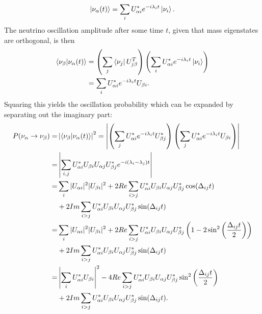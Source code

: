 \begin{equation}
\ket{\nu_\alpha(t)} = \sum_i U_{\alpha i}^*e^{-i\lambda_i t}\ket{\nu_i}.
\end{equation}
The neutrino oscillation amplitude after some time $t$, given that mass eigenstates are orthogonal, is then
\begin{align}
\braket{\nu_\beta|\nu_\alpha(t)} &= \left(\sum_j \bra{\nu_j}U^T_{j\beta}\right)\left( \sum_i U_{\alpha i}^*e^{-i\lambda_i t}\ket{\nu_i}\right)\\
&= \sum_i U^*_{\alpha i} e^{-i\lambda_i t} U_{\beta i}.
\end{align}
Squaring this yields the oscillation probability which can be expanded by separating out the imaginary part:
\begin{align}
P(\nu_\alpha\rightarrow\nu_\beta)  = &\left|\braket{\nu_\beta|\nu_\alpha(t)}\right|^2 = \left|\left(\sum_j U_{\alpha i}^*e^{-i\lambda_i t} U^*_{\beta j}\right)\left(\sum_j U^*_{\alpha i}e^{-i\lambda_i t} U_{\beta i}\right)\right|\\
= &\left|\sum_{i,j}U^*_{\alpha i}U_{\beta i}U_{\alpha j}U^*_{\beta j}e^{-i(\lambda_i-\lambda_j)t}\right| \\
= &\sum_i |U_{\alpha i}|^2|U_{\beta i}|^2 +2Re\sum_{i>j}U^*_{\alpha i}U_{\beta i}U_{\alpha j}U^*_{\beta j}\cos(\Delta_{ij}t)\nonumber\\
&+2Im\sum_{i>j}U^*_{\alpha i}U_{\beta i}U_{\alpha j}U^*_{\beta j}\sin(\Delta_{ij}t) \\
= &\sum_i |U_{\alpha i}|^2|U_{\beta i}|^2 +2Re\sum_{i>j}U^*_{\alpha i}U_{\beta i}U_{\alpha j}U^*_{\beta j}\left(1-2\sin^2\left(\frac{\Delta_{ij}t}{2}\right)\right)\nonumber\\
&+2Im\sum_{i>j}U^*_{\alpha i}U_{\beta i}U_{\alpha j}U^*_{\beta j}\sin(\Delta_{ij}t) \\
= &\left|\sum_i U^*_{\alpha i}U_{\beta i}\right|^2-4Re\sum_{i>j}U^*_{\alpha i}U_{\beta i}U_{\alpha j}U^*_{\beta j}\sin^2\left(\frac{\Delta_{ij}t}{2}\right)\nonumber\\
&+2Im\sum_{i>j}U^*_{\alpha i}U_{\beta i}U_{\alpha j}U^*_{\beta j}\sin(\Delta_{ij}t).
\end{align}

